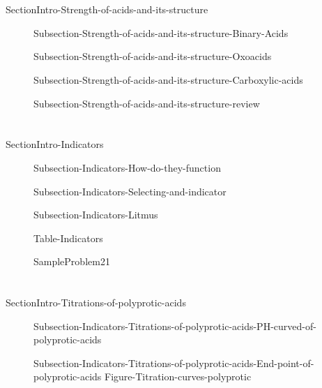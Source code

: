\documentclass[main.tex]{subfiles}
\begin{document}
 \section{\color{blue!30!black}{Molecular mechanisms behind acid-base strength}}{SectionIntro-Strength-of-acids-and-its-structure}
\sloppy\begin{description}
\item[] {Subsection-Strength-of-acids-and-its-structure-Binary-Acids}
\item[] {Subsection-Strength-of-acids-and-its-structure-Oxoacids}
\item[] {Subsection-Strength-of-acids-and-its-structure-Carboxylic-acids}
\item[] {Subsection-Strength-of-acids-and-its-structure-review}
 \end{description}

  \section{\color{blue!30!black}{Indicators}}{SectionIntro-Indicators}
\sloppy\begin{description}
\item[] {Subsection-Indicators-How-do-they-function}
\item[] {Subsection-Indicators-Selecting-and-indicator}
   \item[] {Subsection-Indicators-Litmus}

  \vspace{0cm} \hspace{-4cm} {Table-Indicators} 

   {SampleProblem21}

 \end{description}
 
 
  \section{\color{blue!30!black}{Titrations of polyprotic acids}}{SectionIntro-Titrations-of-polyprotic-acids}
\sloppy\begin{description}
\item[] {Subsection-Indicators-Titrations-of-polyprotic-acids-PH-curved-of-polyprotic-acids}
\item[] {Subsection-Indicators-Titrations-of-polyprotic-acids-End-point-of-polyprotic-acids}
  {Figure-Titration-curves-polyprotic}

 \end{description}
 
\end{document}
